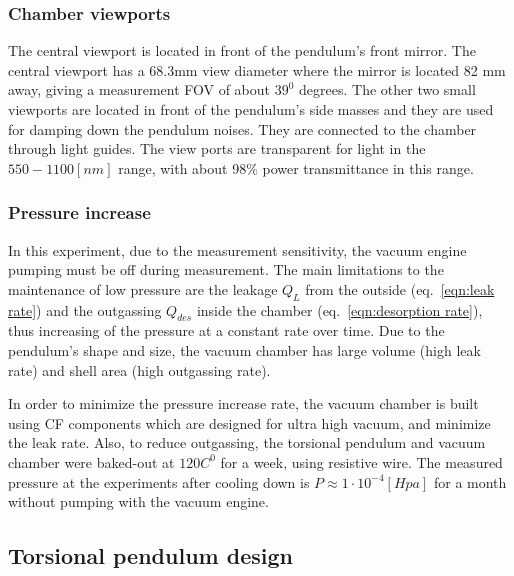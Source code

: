 \documentclass[\main/master.tex]{subfiles}
\begin{document}
\subsubsection{Chamber viewports}
\par\noindent
The central viewport is located in front of the pendulum's front mirror. The central viewport has a 68.3mm view diameter where the mirror is located 82 mm away, giving a measurement FOV of about $39^0$ degrees. The other two small viewports are located in front of the pendulum's side masses and they are used for damping down the pendulum noises. They are connected to the chamber through light guides. The view ports are transparent for light in the $550-1100 [nm]$ range, with about 98$\%$ power transmittance in this range. 


\subsubsection{Pressure increase}
\par\noindent
In this experiment, due to the measurement sensitivity, the vacuum engine pumping must be off during measurement. The main limitations to the maintenance of low pressure are the leakage $Q_L$ from the outside (eq.~\ref{eqn:leak rate}) and the outgassing $Q_{des}$ inside the chamber (eq.~\ref{eqn:desorption rate}), thus increasing of the pressure at a constant rate over time. Due to the pendulum's shape and size, the vacuum chamber has large volume (high leak rate) and shell area (high outgassing rate).
\par\noindent
In order to minimize the pressure increase rate, the vacuum chamber is built using CF components which are designed for ultra high vacuum, and minimize the leak rate. Also, to reduce outgassing, the torsional pendulum and vacuum chamber were baked-out at $120 C^0$ for a week, using resistive wire. The measured pressure at the experiments after cooling down is $P \approx 1\cdot 10^{−4} [Hpa]$ for a month without pumping with the vacuum engine.
\subsection{Torsional pendulum design}
\end{document}
